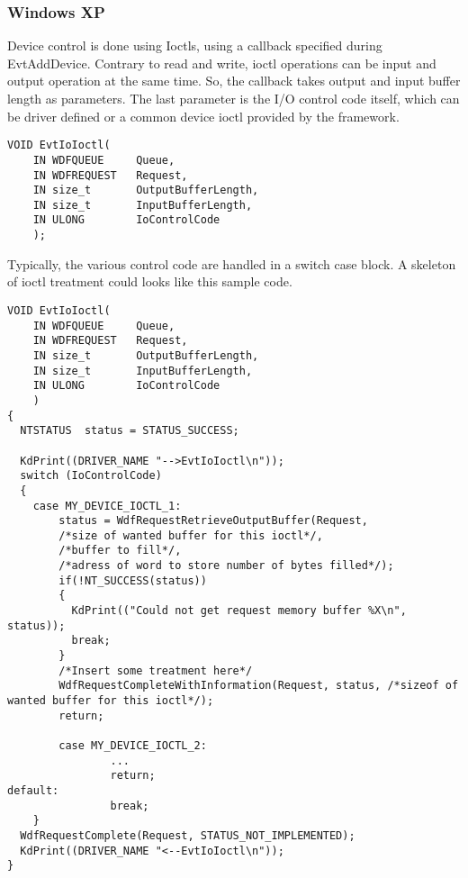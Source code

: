 \documentclass[11pt]{report}
\begin{document}
\subsubsection{Windows XP}
Device control is done using Ioctls, using a callback specified during EvtAddDevice.
Contrary to read and write, ioctl operations can be input and output operation
at the same time. So, the callback takes output and input buffer length as parameters.
The last parameter is the I/O control code itself, which can be driver defined
or a common device ioctl provided by the framework.
\begin{lstlisting}
VOID EvtIoIoctl(
    IN WDFQUEUE		Queue,
    IN WDFREQUEST	Request,
    IN size_t		OutputBufferLength,
    IN size_t		InputBufferLength,
    IN ULONG		IoControlCode
    );
\end{lstlisting}
Typically, the various control code are handled in a switch case block.
A skeleton of ioctl treatment could looks like this sample code.
\begin{lstlisting}
VOID EvtIoIoctl(
    IN WDFQUEUE		Queue,
    IN WDFREQUEST	Request,
    IN size_t		OutputBufferLength,
    IN size_t		InputBufferLength,
    IN ULONG		IoControlCode
    )
{
  NTSTATUS	status = STATUS_SUCCESS;

  KdPrint((DRIVER_NAME "-->EvtIoIoctl\n"));
  switch (IoControlCode)
  {
    case MY_DEVICE_IOCTL_1:
        status = WdfRequestRetrieveOutputBuffer(Request,
        /*size of wanted buffer for this ioctl*/,
        /*buffer to fill*/,
        /*adress of word to store number of bytes filled*/);
        if(!NT_SUCCESS(status))
        {
          KdPrint(("Could not get request memory buffer %X\n", status));
          break;
        }
        /*Insert some treatment here*/
        WdfRequestCompleteWithInformation(Request, status, /*sizeof of wanted buffer for this ioctl*/);
        return;
    
        case MY_DEVICE_IOCTL_2:
                ...
                return;
default:
                break;
	}
  WdfRequestComplete(Request, STATUS_NOT_IMPLEMENTED);
  KdPrint((DRIVER_NAME "<--EvtIoIoctl\n"));
}
\end{lstlisting}
\end{document}
